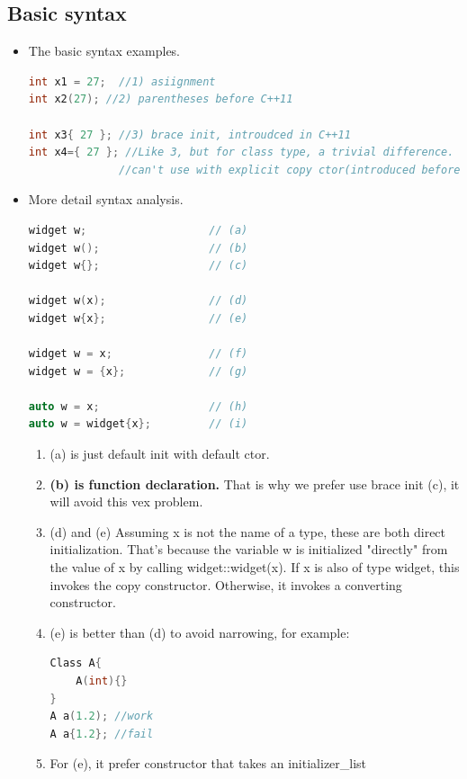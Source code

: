 \documentclass[a4paper,11pt,twoside]{book}
\begin{document}
\subsection{Basic syntax}
\begin{itemize}
	
	\item The basic syntax examples. 
\begin{lstlisting}[frame=single, language=c++,mathescape=true]
int x1 = 27;  //1) asiignment
int x2(27); //2) parentheses before C++11

int x3{ 27 }; //3) brace init, introudced in C++11
int x4={ 27 }; //Like 3, but for class type, a trivial difference. 
              //can't use with explicit copy ctor(introduced before)
\end{lstlisting}
	
	
\item More detail syntax analysis.
\begin{lstlisting}[frame=single, language=c++,mathescape=true]
widget w;                   // (a)
widget w();                 // (b)
widget w{};                 // (c)
	
widget w(x);                // (d)
widget w{x};                // (e)
	
widget w = x;               // (f)
widget w = {x};             // (g)
	
auto w = x;                 // (h)
auto w = widget{x};         // (i)
\end{lstlisting}
	
	\begin{enumerate}
		\item (a) is just default init with default ctor.
		\item \textbf{(b) is function declaration.} That is why we prefer use brace init (c), it will avoid this vex problem.
		
		\item (d) and (e) Assuming x is not the name of a type, these are both direct initialization. That's because the variable w is initialized "directly" from the value of x by calling widget::widget(x). If x is also of type widget, this invokes the copy constructor. Otherwise, it invokes a converting constructor.
		
		\item (e) is better than (d) to avoid narrowing, for example:
\begin{lstlisting}[frame=single, language=c++,mathescape=true]
Class A{
	A(int){}
}
A a(1.2); //work
A a{1.2}; //fail
\end{lstlisting}
		\item For (e), it prefer constructor that takes an initializer\_list
		

\end{enumerate}
\end{itemize}
\end{document}

